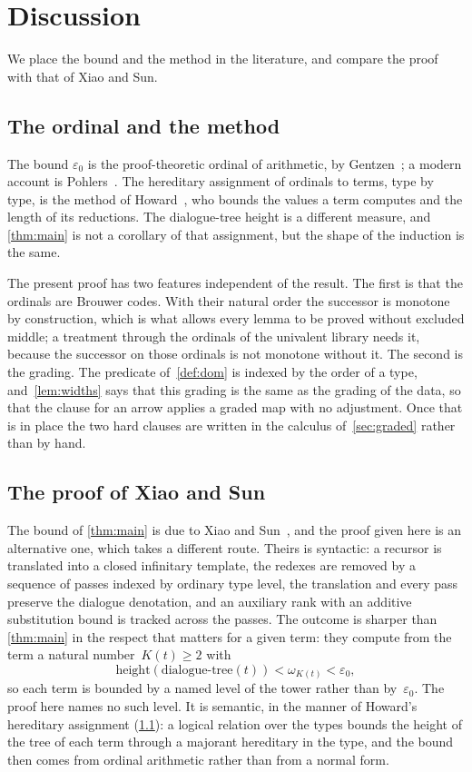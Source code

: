 \documentclass[11pt]{amsart}
\newcommand{\dtree}{\mathrm{dialogue\text{-}tree}}
\newcommand{\height}{\mathrm{height}}
\newcommand{\eps}{\varepsilon_{0}}
\newcommand{\tower}[1]{\omega_{#1}}           %
\theoremstyle{plain}
\theoremstyle{definition}
\begin{document}
\section{Discussion}
\label{sec:discussion}

We place the bound and the method in the literature, and compare the
proof with that of Xiao and Sun.

\subsection{The ordinal and the method}
\label{sec:method}

The bound $\eps$ is the proof-theoretic ordinal of arithmetic, by
Gentzen~\cite{Gentzen1936}; a modern account is
Pohlers~\cite{Pohlers2009}. The hereditary assignment of ordinals to
terms, type by type, is the method of Howard~\cite{Howard1970}, who
bounds the values a term computes and the length of its reductions.
The dialogue-tree height is a different measure, and
\cref{thm:main} is not a corollary of that assignment, but the shape
of the induction is the same.

The present proof has two features independent of the result. The
first is that the ordinals are Brouwer codes. With their natural
order the successor is monotone by construction, which is what allows every lemma to be proved without
excluded middle; a treatment through the ordinals of the univalent
library needs it, because the successor on those ordinals is not
monotone without it. The second
is the grading. The predicate of~\cref{def:dom} is indexed by the
order of a type, and~\cref{lem:widths} says that this grading is the
same as the grading of the data, so that the clause for an arrow
applies a graded map with no adjustment. Once that is in place the two
hard clauses are written in the calculus of~\cref{sec:graded} rather
than by hand.

\subsection{The proof of Xiao and Sun}
\label{sec:xiaosun}

The bound of \cref{thm:main} is due to Xiao and
Sun~\cite{XiaoSun2026}, and the proof given here is an alternative
one, which takes a different route. Theirs is syntactic: a recursor is
translated into a closed infinitary template, the redexes are removed by a
sequence of passes indexed by ordinary type level, the translation and
every pass preserve the dialogue denotation, and an auxiliary rank
with an additive substitution bound is tracked across the passes. The
outcome is sharper than \cref{thm:main} in the respect that matters
for a given term: they compute from the term a natural
number~$K(t) \ge 2$ with
\[
  \height(\dtree(t)) < \tower{K(t)} < \eps ,
\]
so each term is bounded by a named level of the tower rather than
by~$\eps$. The proof here names no such level. It is semantic, in the
manner of Howard's hereditary assignment (\cref{sec:method}): a
logical relation over the types bounds the height of the tree of each
term through a majorant hereditary in the type, and the bound then
comes from ordinal arithmetic rather than from a normal form.
\end{document}
